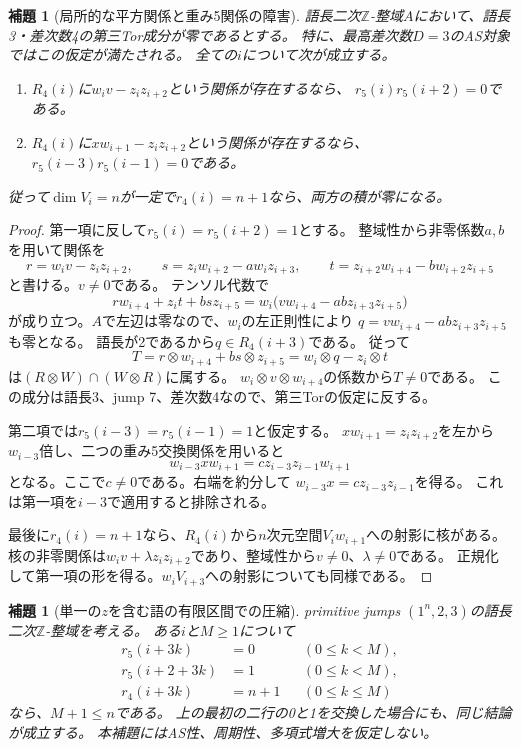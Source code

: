 \documentclass[11pt,a4paper]{ltjsarticle}
\newtheorem{lemma}[theorem]{補題}
\theoremstyle{definition}
\begin{document}
\begin{lemma}[局所的な平方関係と重み5関係の障害]
\label{n4:lem:local-square-r5}
語長二次$\mathbb Z$-整域$A$において、語長3・差次数4の第三Tor成分が零であるとする。
特に、最高差次数$D=3$のAS対象ではこの仮定が満たされる。
全ての$i$について次が成立する。
\begin{enumerate}
\item $R_4(i)$に$w_i v-z_i z_{i+2}$という関係が存在するなら、
      $r_5(i)r_5(i+2)=0$である。
\item $R_4(i)$に$xw_{i+1}-z_i z_{i+2}$という関係が存在するなら、
      $r_5(i-3)r_5(i-1)=0$である。
\end{enumerate}
従って$\dim V_i=n$が一定で$r_4(i)=n+1$なら、両方の積が零になる。
\end{lemma}
\begin{proof}
第一項に反して$r_5(i)=r_5(i+2)=1$とする。
整域性から非零係数$a,b$を用いて関係を
\[
r=w_i v-z_i z_{i+2},\qquad
s=z_i w_{i+2}-a w_i z_{i+3},\qquad
t=z_{i+2}w_{i+4}-b w_{i+2}z_{i+5}
\]
と書ける。$v\ne0$である。
テンソル代数で
\[
r w_{i+4}+z_i t+b s z_{i+5}
=w_i\bigl(vw_{i+4}-ab z_{i+3}z_{i+5}\bigr)
\]
が成り立つ。$A$で左辺は零なので、$w_i$の左正則性により
$q=vw_{i+4}-ab z_{i+3}z_{i+5}$も零となる。
語長が2であるから$q\in R_4(i+3)$である。
従って
\[
T=r\otimes w_{i+4}+b s\otimes z_{i+5}
 =w_i\otimes q-z_i\otimes t
\]
は$(R\otimes W)\cap(W\otimes R)$に属する。
$w_i\otimes v\otimes w_{i+4}$の係数から$T\ne0$である。
この成分は語長3、jump 7、差次数4なので、第三Torの仮定に反する。

第二項では$r_5(i-3)=r_5(i-1)=1$と仮定する。
$xw_{i+1}=z_i z_{i+2}$を左から$w_{i-3}$倍し、二つの重み5交換関係を用いると
\[
 w_{i-3}xw_{i+1}=c z_{i-3}z_{i-1}w_{i+1}
\]
となる。ここで$c\ne0$である。右端を約分して
$w_{i-3}x=c z_{i-3}z_{i-1}$を得る。
これは第一項を$i-3$で適用すると排除される。

最後に$r_4(i)=n+1$なら、$R_4(i)$から$n$次元空間$V_iw_{i+1}$への射影に核がある。
核の非零関係は$w_i v+\lambda z_i z_{i+2}$であり、整域性から$v\ne0$、$\lambda\ne0$である。
正規化して第一項の形を得る。$w_iV_{i+3}$への射影についても同様である。
\end{proof}

\begin{lemma}[単一の$z$を含む語の有限区間での圧縮]
\label{d3:lem:single-z-collapse}
primitive jumps $(1^n,2,3)$の語長二次$\mathbb Z$-整域を考える。
ある$i$と$M\ge1$について
\begin{align*}
r_5(i+3k)&=0 &&(0\le k<M),\\
r_5(i+2+3k)&=1 &&(0\le k<M),\\
r_4(i+3k)&=n+1 &&(0\le k\le M)
\end{align*}
なら、$M+1\le n$である。
上の最初の二行の0と1を交換した場合にも、同じ結論が成立する。
本補題にはAS性、周期性、多項式増大を仮定しない。
\end{lemma}
\end{document}
